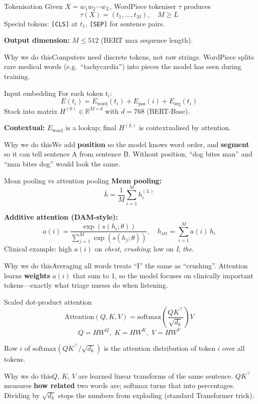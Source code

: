 \documentclass[aspectratio=169,11pt]{beamer}
\newcommand{\why}[1]{\begin{block}{Why we do this}\small #1\end{block}}
\begin{document}
\begin{frame}{Tokenisation}
	Given $X = w_1 w_2 \cdots w_L$, WordPiece tokeniser $\tau$ produces
	\[
	\tau(X) = (t_1,\ldots,t_M), \quad M \geq L
	\]
	Special tokens: \texttt{[CLS]} at $t_1$, \texttt{[SEP]} for sentence pairs.

	\textbf{Output dimension:} $M \leq 512$ (BERT max sequence length).

	\why{Computers need discrete tokens, not raw strings. WordPiece splits rare medical words (e.g.\ ``tachycardia'') into pieces the model has seen during training.}
\end{frame}

\begin{frame}{Input embedding}
	For each token $t_i$:
	\[
	E(t_i) = E_{\text{word}}(t_i) + E_{\text{pos}}(i) + E_{\text{seg}}(t_i)
	\]
	Stack into matrix $H^{(0)} \in \mathbb{R}^{M \times d}$ with $d=768$ (BERT-Base).

	\textbf{Contextual:} $E_{\text{word}}$ is a lookup; final $H^{(L)}$ is contextualised by attention.

	\why{We add \textbf{position} so the model knows word order, and \textbf{segment} so it can tell sentence A from sentence B. Without position, ``dog bites man'' and ``man bites dog'' would look the same.}
\end{frame}

\begin{frame}{Mean pooling vs attention pooling}
	\textbf{Mean pooling:}
	\[
	\bar{h} = \frac{1}{M}\sum_{i=1}^{M} h_i^{(L)}
	\]

	\textbf{Additive attention (DAM-style):}
	\[
	a(i) = \frac{\exp(s(h_i;\theta))}{\sum_{j=1}^{M}\exp(s(h_j;\theta))},
	\quad
	h_{\text{att}} = \sum_{i=1}^{M} a(i)\, h_i
	\]
	Clinical example: high $a(i)$ on \textit{chest}, \textit{crushing}; low on \textit{I}, \textit{the}.

	\why{Averaging all words treats ``I'' the same as ``crushing''. Attention learns \textbf{weights} $a(i)$ that sum to 1, so the model focuses on clinically important tokens---exactly what triage nurses do when listening.}
\end{frame}

\begin{frame}{Scaled dot-product attention}
	\[
	\mathrm{Attention}(Q,K,V) = \mathrm{softmax}\!\left(\frac{QK^\top}{\sqrt{d_k}}\right) V
	\]
	\[
	Q = H W^Q,\; K = H W^K,\; V = H W^V
	\]

	Row $i$ of $\mathrm{softmax}(QK^\top/\sqrt{d_k})$ is the attention distribution of token $i$ over all tokens.

	\why{$Q$, $K$, $V$ are learned linear transforms of the same sentence. $QK^\top$ measures \textbf{how related} two words are; softmax turns that into percentages. Dividing by $\sqrt{d_k}$ stops the numbers from exploding (standard Transformer trick).}
\end{frame}
\end{document}
